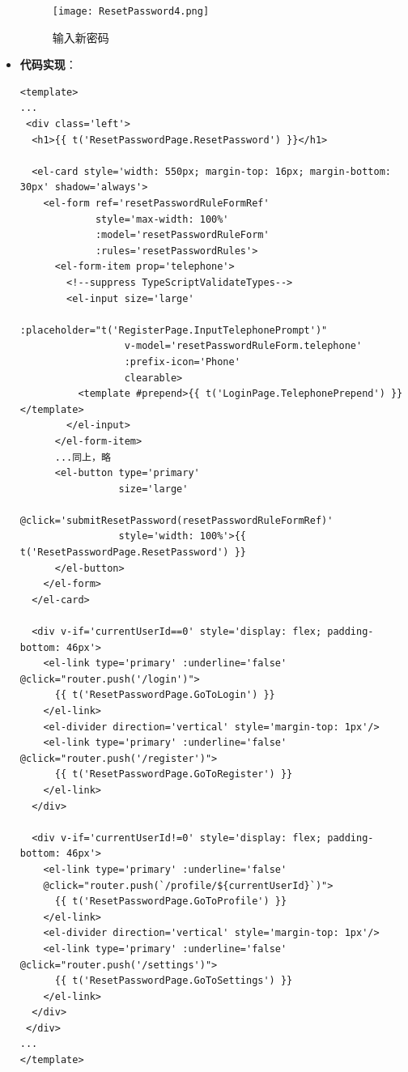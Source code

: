 \begin{itemize}
	\begin{figure}[H]
		\centering
		\texttt{[image: ResetPassword4.png]}
		\caption{输入新密码}
	\end{figure}

	\item \textbf{代码实现}：
	\begin{verbatim}
<template>
...
 <div class='left'>
  <h1>{{ t('ResetPasswordPage.ResetPassword') }}</h1>
	
  <el-card style='width: 550px; margin-top: 16px; margin-bottom: 30px' shadow='always'>
    <el-form ref='resetPasswordRuleFormRef'
             style='max-width: 100%'
             :model='resetPasswordRuleForm'
             :rules='resetPasswordRules'>
      <el-form-item prop='telephone'>
        <!--suppress TypeScriptValidateTypes-->
        <el-input size='large'
                  :placeholder="t('RegisterPage.InputTelephonePrompt')"
                  v-model='resetPasswordRuleForm.telephone'
                  :prefix-icon='Phone'
                  clearable>
          <template #prepend>{{ t('LoginPage.TelephonePrepend') }}</template>
        </el-input>
      </el-form-item>
      ...同上，略
      <el-button type='primary'
                 size='large'
                 @click='submitResetPassword(resetPasswordRuleFormRef)'
                 style='width: 100%'>{{ t('ResetPasswordPage.ResetPassword') }}
      </el-button>
    </el-form>
  </el-card>
	
  <div v-if='currentUserId==0' style='display: flex; padding-bottom: 46px'>
    <el-link type='primary' :underline='false' @click="router.push('/login')">
      {{ t('ResetPasswordPage.GoToLogin') }}
    </el-link>
    <el-divider direction='vertical' style='margin-top: 1px'/>
    <el-link type='primary' :underline='false' @click="router.push('/register')">
      {{ t('ResetPasswordPage.GoToRegister') }}
    </el-link>
  </div>
	
  <div v-if='currentUserId!=0' style='display: flex; padding-bottom: 46px'>
    <el-link type='primary' :underline='false' 
    @click="router.push(`/profile/${currentUserId}`)">
      {{ t('ResetPasswordPage.GoToProfile') }}
    </el-link>
    <el-divider direction='vertical' style='margin-top: 1px'/>
    <el-link type='primary' :underline='false' @click="router.push('/settings')">
      {{ t('ResetPasswordPage.GoToSettings') }}
    </el-link>
  </div>
 </div>
...
</template>
	\end{verbatim}
	

\end{itemize}
